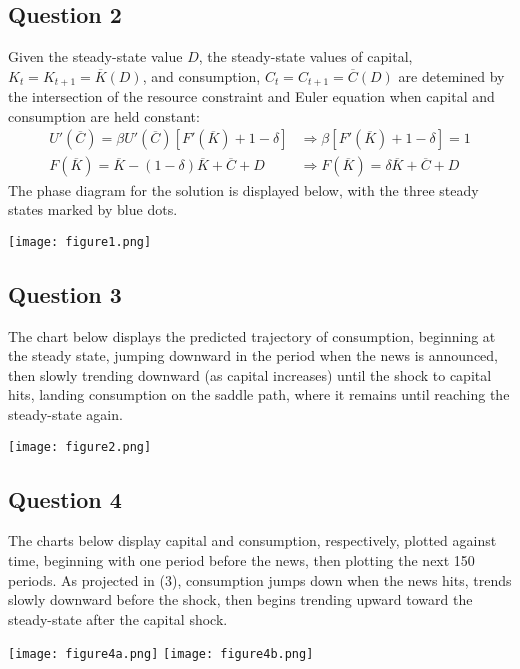 \documentclass{article}
\begin{document}
\subsection*{Question 2}
Given the steady-state value $D$, the steady-state values of capital, ${K_t=K_{t+1}=\overline{K}(D)}$, and consumption, ${C_t=C_{t+1}=\overline{C}(D)}$ are detemined by the intersection of the resource constraint and Euler equation when capital and consumption are held constant:
\begin{align*}
	U'(\overline{C}) = \beta U'(\overline{C})\left[F'(\overline{K})+1-\delta\right] 
		&\Rightarrow \beta\left[F'(\overline{K})+1-\delta\right] = 1	\\
	F(\overline{K}) = \overline{K} - (1-\delta)\overline{K} + \overline{C} + D
		&\Rightarrow F(\overline{K}) = \delta\overline{K} + \overline{C} + D
\end{align*}
The phase diagram for the solution is displayed below, with the three steady states marked by blue dots.
\begin{center}
	\texttt{[image: figure1.png]}
\end{center}


\subsection*{Question 3}
The chart below displays the predicted trajectory of consumption, beginning at the steady state, jumping downward in the period when the news is announced, then slowly trending downward (as capital increases) until the shock to capital hits, landing consumption on the saddle path, where it remains until reaching the steady-state again.
\begin{center}
	\texttt{[image: figure2.png]}
\end{center}


\subsection*{Question 4}
The charts below display capital and consumption, respectively, plotted against time, beginning with one period before the news, then plotting the next 150 periods. As projected in (3), consumption jumps down when the news hits, trends slowly downward before the shock, then begins trending upward toward the steady-state after the capital shock.
\begin{center}
	\texttt{[image: figure4a.png]} \texttt{[image: figure4b.png]}
\end{center}

\end{document}
